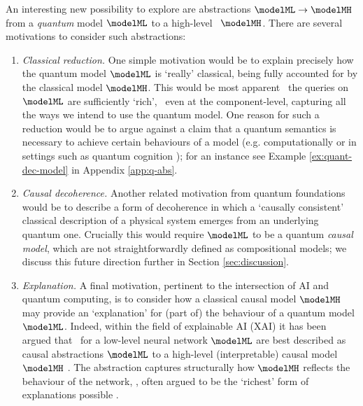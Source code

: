 \documentclass{article}
\begin{document}
An interesting new possibility to explore are abstractions $\modelML \to \modelMH$ from a \emph{quantum} model $\modelML$ to a high-level \ $\modelMH$. There are several motivations to consider such abstractions:
\begin{enumerate}

	\item \emph{Classical reduction.} One simple motivation would be to explain precisely how the quantum model $\modelML$ is `really' classical, being fully accounted for by the classical model $\modelMH$. This would be most apparent \ the queries on $\modelML$ are sufficiently `rich', \ even at the component-level, capturing all the ways we intend to use the quantum model. One reason for such a reduction would be to argue against a claim that a quantum semantics is necessary to achieve certain behaviours of a model (e.g. computationally or in settings such as quantum cognition \cite{QCog}); for an instance see Example \ref{ex:quant-dec-model} in Appendix \ref{app:q-abs}. 
	\item \emph{Causal decoherence.} Another related motivation from quantum foundations would be to describe a form of decoherence in which a `causally consistent' classical description of a physical system emerges from an underlying quantum one. Crucially this would require $\modelML$ to be a quantum \emph{causal model}, which are not straightforwardly defined as compositional models; we discuss this future direction further in Section \ref{sec:discussion}. 
	\item \emph{Explanation.} A final motivation, pertinent to the intersection of AI and quantum computing, is to consider how a classical causal model $\modelMH$ may provide an `explanation' for (part of) the behaviour of a quantum model $\modelML$. Indeed, within the field of explainable AI (XAI) it has been argued that \ for a low-level neural network $\modelML$ are best described as causal abstractions $\modelML$ to a high-level (interpretable) causal model $\modelMH$ . The abstraction captures structurally how $\modelMH$ reflects the behaviour of the network, , often argued to be the `richest' form of explanations possible . 


\end{enumerate}
\end{document}
